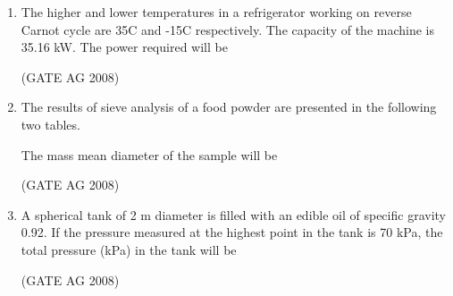 \documentclass[journal]{IEEEtran}
\begin{document}
\begin{enumerate}
\medskip

\item 
 The higher and lower temperatures in a refrigerator working on reverse Carnot cycle are 35\textdegree C and -15\textdegree C respectively. The capacity of the machine is 35.16 kW. The power required will be
\begin{enumerate}
\end{enumerate}
\hfill(GATE AG 2008)\\

\medskip

\item 
 The results of sieve analysis of a food powder are presented in the following two tables.


\medskip



The mass mean diameter of the sample will be
\begin{enumerate}
\end{enumerate}
\hfill(GATE AG 2008)\\

\medskip

\item 
 A spherical tank of 2 m diameter is filled with an edible oil of specific gravity 0.92. If the pressure measured at the highest point in the tank is 70 kPa, the total pressure (kPa) in the tank will be
\begin{enumerate}
\end{enumerate}
\hfill(GATE AG 2008)\\


\end{enumerate}
\end{document}
